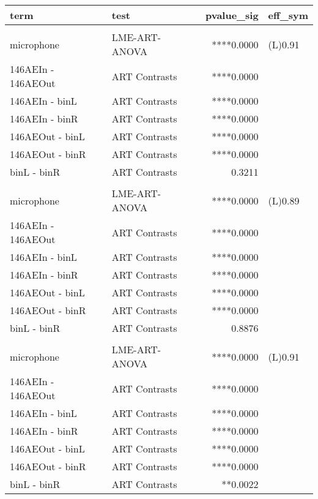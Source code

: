 \begin{table}
\fontsize{12.0pt}{14.4pt}\selectfont
\begin{tabular*}{\linewidth}{@{\extracolsep{\fill}}llrl}
\toprule
term & test & pvalue\_sig & eff\_sym \\ 
\midrule\addlinespace[2.5pt]
\multicolumn{4}{l}{LAS} \\[2.5pt] 
\midrule\addlinespace[2.5pt]
microphone & LME-ART-ANOVA & ****0.0000 & (L)0.91 \\ 
146AEIn - 146AEOut & ART Contrasts & ****0.0000 &  \\ 
146AEIn - binL & ART Contrasts & ****0.0000 &  \\ 
146AEIn - binR & ART Contrasts & ****0.0000 &  \\ 
146AEOut - binL & ART Contrasts & ****0.0000 &  \\ 
146AEOut - binR & ART Contrasts & ****0.0000 &  \\ 
binL - binR & ART Contrasts &  0.3211 &  \\ 
\midrule\addlinespace[2.5pt]
\multicolumn{4}{l}{LAS10} \\[2.5pt] 
\midrule\addlinespace[2.5pt]
microphone & LME-ART-ANOVA & ****0.0000 & (L)0.89 \\ 
146AEIn - 146AEOut & ART Contrasts & ****0.0000 &  \\ 
146AEIn - binL & ART Contrasts & ****0.0000 &  \\ 
146AEIn - binR & ART Contrasts & ****0.0000 &  \\ 
146AEOut - binL & ART Contrasts & ****0.0000 &  \\ 
146AEOut - binR & ART Contrasts & ****0.0000 &  \\ 
binL - binR & ART Contrasts &  0.8876 &  \\ 
\midrule\addlinespace[2.5pt]
\multicolumn{4}{l}{LAS50} \\[2.5pt] 
\midrule\addlinespace[2.5pt]
microphone & LME-ART-ANOVA & ****0.0000 & (L)0.91 \\ 
146AEIn - 146AEOut & ART Contrasts & ****0.0000 &  \\ 
146AEIn - binL & ART Contrasts & ****0.0000 &  \\ 
146AEIn - binR & ART Contrasts & ****0.0000 &  \\ 
146AEOut - binL & ART Contrasts & ****0.0000 &  \\ 
146AEOut - binR & ART Contrasts & ****0.0000 &  \\ 
binL - binR & ART Contrasts & **0.0022 &  \\ 

\end{tabular*}
\end{table}
